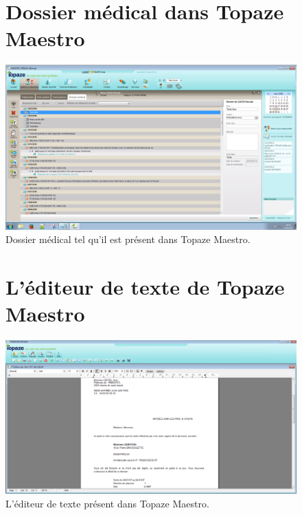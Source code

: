 \begin{appendices}

\begin{figure}[H]
\section*{Dossier médical dans Topaze Maestro}
  \centering
  \centerline{\includegraphics[width=18cm]{./img/medical_data_maestro.PNG}}
  \caption{\label{fig:dossier_medical} Dossier médical tel qu'il est présent dans Topaze Maestro.}
\end{figure}

\newpage
\begin{figure}[H]
\section*{L'éditeur de texte de Topaze Maestro}
  \centering
  \centerline{\includegraphics[width=18cm]{./img/text_editor2}}
  \caption{\label{fig:editeur_texte} L'éditeur de texte présent dans Topaze Maestro.}
\end{figure}


\newpage
\begin{figure}[H]

\end{figure}
\end{appendices}
